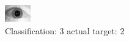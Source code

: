 \begin{figure}[h!]
\begin{center}
\includegraphics[width=0.60\columnwidth]{figures/ID1683_class_3_target_2.png}
\end{center}
\caption{ Classification: 3 actual target: 2}
\label{fig:ID1683_class_3_target_2}
\end{figure}
